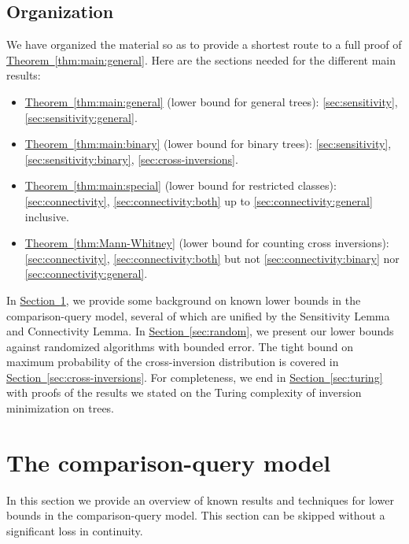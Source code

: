\documentclass[11pt]{article}
\numberwithin{equation}{section}
\theoremstyle{definition}
\theoremstyle{plain}
\newcommand{\expref}[2]{\hyperref[#2]{#1~\ref{#2}}}
\begin{document}
\subsection{Organization} 
%
We have organized the material so as to provide a shortest route to a full proof of \expref{Theorem}{thm:main:general}. Here are the sections needed for the different main results:
\begin{itemize}
\item \expref{Theorem}{thm:main:general} (lower bound for general trees): \ref{sec:sensitivity}, \ref{sec:sensitivity:general}.
\item \expref{Theorem}{thm:main:binary} (lower bound for binary trees):  \ref{sec:sensitivity}, \ref{sec:sensitivity:binary}, \ref{sec:cross-inversions}.
\item \expref{Theorem}{thm:main:special} (lower bound for restricted classes): \ref{sec:connectivity}, \ref{sec:connectivity:both} up to \ref{sec:connectivity:general} inclusive.
\item \expref{Theorem}{thm:Mann-Whitney} (lower bound for counting cross inversions): \ref{sec:connectivity}, \ref{sec:connectivity:both} but not \ref{sec:connectivity:binary} nor \ref{sec:connectivity:general}.
\end{itemize}
In \expref{Section}{sec:model}, we provide some background on known lower bounds in the comparison-query model, several of which are unified by the Sensitivity Lemma and Connectivity Lemma. In \expref{Section}{sec:random}, we present our lower bounds against randomized algorithms with bounded error. The tight bound on maximum probability of the cross-inversion distribution is covered in \expref{Section}{sec:cross-inversions}. For completeness, we end in \expref{Section}{sec:turing} with proofs of the results we stated on the Turing complexity of inversion minimization on trees.



\section{The comparison-query model}
\label{sec:model}
%

In this section we provide an overview of known results and techniques for lower bounds in the comparison-query model. This section can be skipped without a significant loss in continuity.
\end{document}
